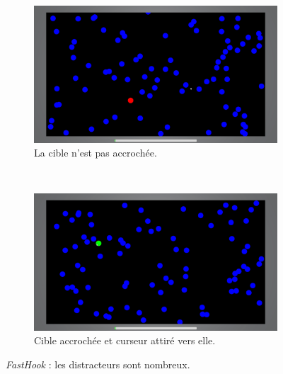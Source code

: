	
	\begin{figure}[htb]
		\begin{subfigure}[t]{0.49\textwidth}
			\centering
			\includegraphics[width=\textwidth]{figures/ch5/pseudohaptics_cursor_red}
			\caption{La cible n'est pas accrochée.}
			\label{fig:pseudohaptics_cursor_red}
		\end{subfigure}
		~
		\begin{subfigure}[t]{0.49\textwidth}
			\centering
			\includegraphics[width=\textwidth]{figures/ch5/pseudohaptics_cursor_green}
			\caption{Cible accrochée et curseur attiré vers elle.}
			\label{fig:pseudohaptics_cursor_green}
		\end{subfigure}
		\caption[Évaluation de \emph{FastHook}]{\emph{FastHook} : les distracteurs sont nombreux.}
		\label{fig:pseudohaptics}
	\end{figure}
	

